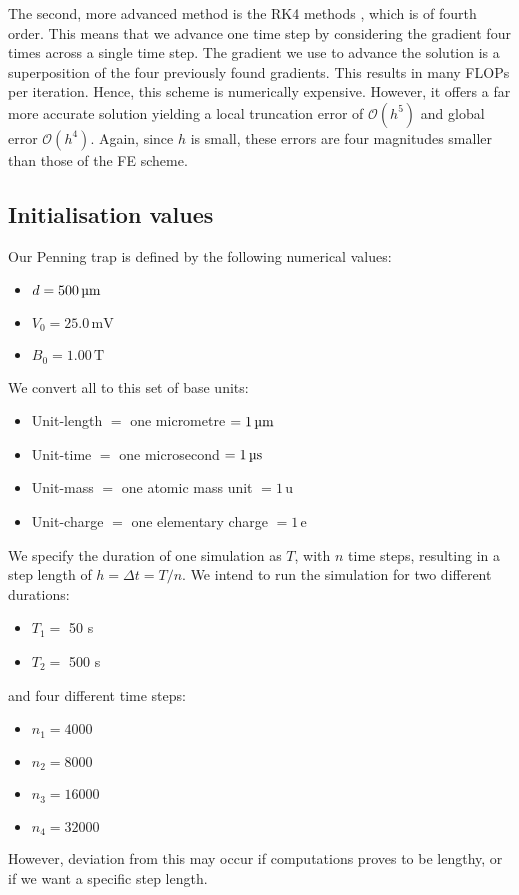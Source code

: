 The second, more advanced method is the RK4 methods \citep{Atkinson1989}, which is of fourth order. This means that we advance one time step by considering the gradient four times across a single time step. The gradient we use to advance the solution is a superposition of the four previously found gradients. This results in many FLOPs per iteration. Hence, this scheme is numerically expensive. However, it offers a far more accurate solution yielding a local truncation error of $\mathcal{O}(h^5)$ and global error $\mathcal{O}(h^4)$. Again, since $h$ is small, these errors are four magnitudes smaller than those of the FE scheme. 


\subsection{Initialisation values} 

Our Penning trap is defined by the following numerical values:

\begin{itemize}
    \item[] $d=500 \,\mathrm{\text{\textmu} m}$
    \item[] $V_0=25.0 \,\mathrm{mV}$
    \item[] $B_0=1.00 \,\mathrm{T}$
\end{itemize}

We convert all to this set of base units:

\begin{itemize}
    \item[] Unit-length $=$ one micrometre $= 1\, \mathrm{\text{\textmu}m} $ 
    \item[] Unit-time $=$ one microsecond $= 1\, \mathrm{\text{\textmu}s} $
    \item[] Unit-mass $=$ one atomic mass unit $= 1\, \mathrm{u} $
    \item[] Unit-charge $=$ one elementary charge $= 1\, \mathrm{e} $
\end{itemize}

We specify the duration of one simulation as $T$, with $n$ time steps, resulting in a step length of $h = \Delta t = T/n$. We intend to run the simulation for two different durations:
\begin{itemize}
    \item[] $T_1 = $ 50 \textmu s
    \item[] $T_2 = $ 500 \textmu s
\end{itemize}
and four different time steps:
\begin{itemize}
    \item[] $n_1 = 4000$
    \item[] $n_2 = 8000$
    \item[] $n_3 = 16000$
    \item[] $n_4 = 32000$
\end{itemize}
However, deviation from this may occur if computations proves to be lengthy, or if we want a specific step length. 

